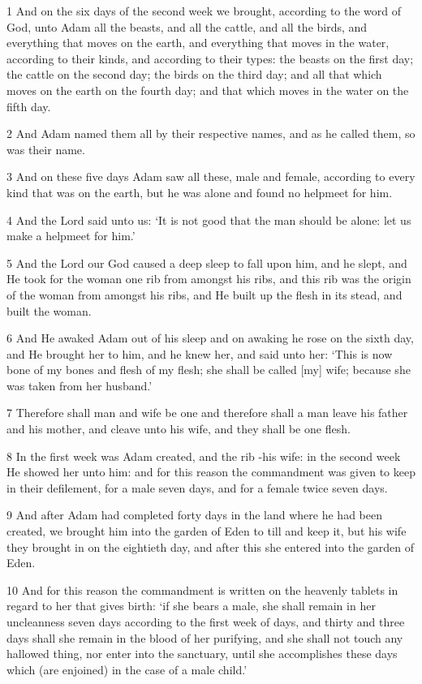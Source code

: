 \par 1 And on the six days of the second week we brought, according to the word of God, unto Adam all the beasts, and all the cattle, and all the birds, and everything that moves on the earth, and everything that moves in the water, according to their kinds, and according to their types: the beasts on the first day; the cattle on the second day; the birds on the third day; and all that which moves on the earth on the fourth day; and that which moves in the water on the fifth day.
\par 2 And Adam named them all by their respective names, and as he called them, so was their name.
\par 3 And on these five days Adam saw all these, male and female, according to every kind that was on the earth, but he was alone and found no helpmeet for him.
\par 4 And the Lord said unto us: ‘It is not good that the man should be alone: let us make a helpmeet for him.’
\par 5 And the Lord our God caused a deep sleep to fall upon him, and he slept, and He took for the woman one rib from amongst his ribs, and this rib was the origin of the woman from amongst his ribs, and He built up the flesh in its stead, and built the woman.
\par 6 And He awaked Adam out of his sleep and on awaking he rose on the sixth day, and He brought her to him, and he knew her, and said unto her: ‘This is now bone of my bones and flesh of my flesh; she shall be called [my] wife; because she was taken from her husband.’
\par 7 Therefore shall man and wife be one and therefore shall a man leave his father and his mother, and cleave unto his wife, and they shall be one flesh.
\par 8 In the first week was Adam created, and the rib -his wife: in the second week He showed her unto him: and for this reason the commandment was given to keep in their defilement, for a male seven days, and for a female twice seven days.
\par 9 And after Adam had completed forty days in the land where he had been created, we brought him into the garden of Eden to till and keep it, but his wife they brought in on the eightieth day, and after this she entered into the garden of Eden.
\par 10 And for this reason the commandment is written on the heavenly tablets in regard to her that gives birth: ‘if she bears a male, she shall remain in her uncleanness seven days according to the first week of days, and thirty and three days shall she remain in the blood of her purifying, and she shall not touch any hallowed thing, nor enter into the sanctuary, until she accomplishes these days which (are enjoined) in the case of a male child.’
